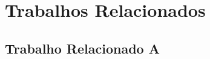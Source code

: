 \chapter{Trabalhos Relacionados}
\label{cap:trabalhos-relacionados}



\section{Trabalho Relacionado A}
\label{sec:trabalho-relacionado-a}
